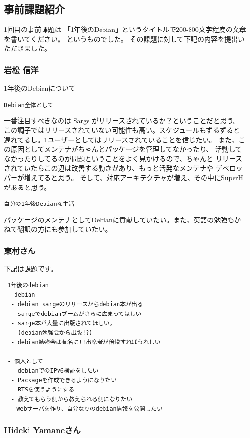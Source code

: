 \documentclass[mingoth]{jsarticle}
\begin{document}
\subsection{事前課題紹介}

1回目の事前課題は
「1年後のDebian」というタイトルで200-800文字程度の文章を書いてください。
というものでした。
その課題に対して下記の内容を提出いただきました。

\subsubsection{岩松 信洋}

1年後のDebianについて

{\tt *Debian全体として}

一番注目すべきなのは Sarge がリリースされているか？ということだと思う。
この調子ではリリースされていない可能性も高い。スケジュールもずるずると
遅れてるし。1ユーザーとしてはリリースされていることを信じたい。
また、この原因としてメンテナがちゃんとパッケージを管理してなかったり、
活動してなかったりしてるのが問題ということをよく見かけるので、ちゃんと
リリースされていたらこの辺は改善する動きがあり、もっと活発なメンテナや
デベロッパーが増えてると思う。
そして、対応アーキテクチャが増え、その中にSuperHがあると思う。

{\tt *自分の1年後Debianな生活}

パッケージのメンテナとしてDebianに貢献していたい。また、英語の勉強もか
ねて翻訳の方にも参加していたい。


\subsubsection{東村さん}

下記は課題です。
\begin{verbatim}
 1年後のdebian
 - debian
  - debian sargeのリリースからdebian本が出る
    sargeでdebianブームがさらに広まってほしい
  - sarge本が大量に出版されてほしい。
    (debian勉強会から出版!?)
  - debian勉強会は有名に!!出席者が倍増すればうれしい

 - 個人として
  - debianでのIPv6検証をしたい
  - Packageを作成できるようになりたい
  - BTSを使うようにする
  - 教えてもらう側から教えられる側になりたい
　- Webサーバを作り、自分なりのdebian情報を公開したい
\end{verbatim}

\subsubsection{Hideki Yamaneさん}
\end{document}

